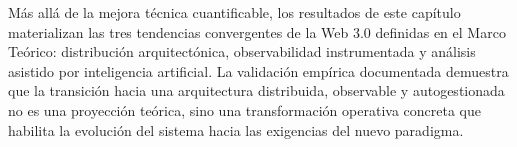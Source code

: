 Más allá de la mejora técnica cuantificable, los resultados de este capítulo
materializan las tres tendencias convergentes de la Web 3.0 definidas en el Marco
Teórico: distribución arquitectónica, observabilidad instrumentada y análisis
asistido por inteligencia artificial. La validación empírica documentada demuestra
que la transición hacia una arquitectura distribuida,
observable y autogestionada no es una proyección teórica, sino una
transformación operativa concreta que habilita la evolución del sistema
hacia las exigencias del nuevo paradigma.
